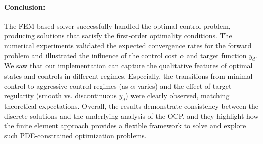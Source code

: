 \paragraph{Conclusion:}
The FEM-based solver successfully handled the optimal control problem, producing solutions that satisfy the first-order optimality conditions. The numerical experiments validated the expected convergence rates for the forward problem and illustrated the influence of the control cost $\alpha$ and target function $y_d$. We saw that our implementation can capture the qualitative features of optimal states and controls in different regimes. Especially, the transitions from minimal control to aggressive control regimes (as $\alpha$ varies) and the effect of target regularity (smooth vs. discontinuous $y_d$) were clearly observed, matching theoretical expectations. Overall, the results demonstrate consistency between the discrete solutions and the underlying analysis of the OCP, and they highlight how the finite element approach provides a flexible framework to solve and explore such PDE-constrained optimization problems.
